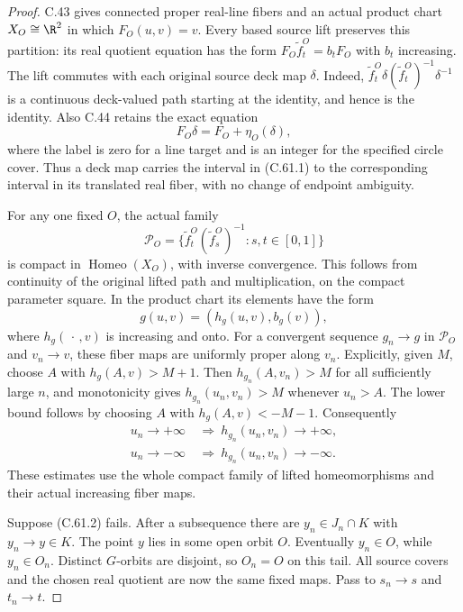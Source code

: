 \begin{proof}
C.43 gives connected proper real-line fibers and
an actual product chart
$X_O\cong\R^2$ in which $F_O(u,v)=v$.
Every based source lift preserves this partition:
its real quotient equation has the form
$F_O\widetilde f_t^O=b_tF_O$ with $b_t$ increasing.
The lift commutes with each original source deck
map $\delta$. Indeed,
$\widetilde f_t^O\delta(\widetilde f_t^O)^{-1}\delta^{-1}$
is a continuous deck-valued path starting at the
identity, and hence is the identity.
Also C.44 retains the exact equation
\[
                 F_O\delta=F_O+\eta_O(\delta),           \tag{C.61.3}
\]
where the label is zero for a line target and is
an integer for the specified circle cover.
Thus a deck map carries the interval in (C.61.1)
to the corresponding interval in its translated
real fiber, with no change of endpoint ambiguity.

For any one fixed $O$, the actual family
\[
 \mathcal P_O=
 \{\widetilde f_t^O(\widetilde f_s^O)^{-1}:
                                      s,t\in[0,1]\}
                                                               \tag{C.61.4}
\]
is compact in $\operatorname{Homeo}(X_O)$, with
inverse convergence. This follows from continuity
of the original lifted path and multiplication,
on the compact parameter square.
In the product chart its elements have the form
\[
            g(u,v)=(h_g(u,v),b_g(v)),                    \tag{C.61.5}
\]
where $h_g(\,\cdot\,,v)$ is increasing and onto.
For a convergent sequence $g_n\to g$ in
$\mathcal P_O$ and $v_n\to v$, these fiber maps
are uniformly proper along $v_n$. Explicitly,
given $M$, choose $A$ with $h_g(A,v)>M+1$.
Then $h_{g_n}(A,v_n)>M$ for all sufficiently
large $n$, and monotonicity gives
$h_{g_n}(u_n,v_n)>M$ whenever $u_n>A$.
The lower bound follows by choosing $A$ with
$h_g(A,v)<-M-1$.
Consequently
\[
 \begin{split}
 u_n\longrightarrow+\infty
   &\ \Longrightarrow\ h_{g_n}(u_n,v_n)\longrightarrow+\infty,\\
 u_n\longrightarrow-\infty
   &\ \Longrightarrow\ h_{g_n}(u_n,v_n)\longrightarrow-\infty.
 \end{split}                                             \tag{C.61.6}
\]
These estimates use the whole compact family
of lifted homeomorphisms and their actual
increasing fiber maps.

Suppose (C.61.2) fails. After a subsequence there
are $y_n\in J_n\cap K$ with $y_n\to y\in K$.
The point $y$ lies in some open orbit $O$.
Eventually $y_n\in O$, while $y_n\in O_n$.
Distinct $G$-orbits are disjoint, so $O_n=O$
on this tail. All source covers and the chosen
real quotient are now the same fixed maps.
Pass to $s_n\to s$ and $t_n\to t$.


\end{proof}

